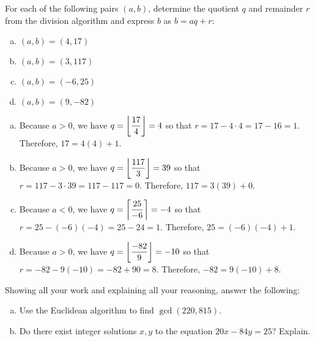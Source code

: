 \documentclass[11pt,letterpaper]{article}
\begin{document}

 For each of the following pairs $(a, b)$, determine the quotient $q$ and remainder $r$ from the division algorithm and express $b$ as $b= aq + r$:
	\begin{enumerate}[(a)]
	\item $(a, b)= (4, 17)$
	\item $(a, b)= (3, 117)$
	\item $(a, b)= (-6, 25)$
	\item $(a, b)= (9, -82)$
	\end{enumerate} \pspace

\sol 
\begin{enumerate}[(a)]
\item Because $a > 0$, we have $q= \floor*{\dfrac{17}{4}}= 4$ so that $r= 17 - 4 \cdot 4= 17 - 16= 1$. Therefore, $17= 4(4) + 1$. \pspace

\item Because $a > 0$, we have $q= \floor*{\dfrac{117}{3}}= 39$ so that $r= 117 - 3 \cdot 39= 117 - 117= 0$. Therefore, $117= 3(39) + 0$. \pspace
 
\item Because $a < 0$, we have $q= \ceil*{\dfrac{25}{-6}}= -4$ so that $r= 25 - (-6)(-4)= 25 - 24= 1$. Therefore, $25= (-6)(-4) + 1$. \pspace
 
\item Because $a > 0$, we have $q= \floor*{\dfrac{-82}{9}}= -10$ so that $r= -82 - 9(-10)= -82 + 90= 8$. Therefore, $-82= 9(-10) + 8$. \pspace
 
\end{enumerate}



\newpage



 Showing all your work and explaining all your reasoning, answer the following:
	\begin{enumerate}[(a)]
	\item Use the Euclidean algorithm to find $\gcd(220, 815)$. 
	\item Do there exist integer solutions $x, y$ to the equation $20x - 84y= 25$? Explain.
	\end{enumerate} \pspace
\end{document}
